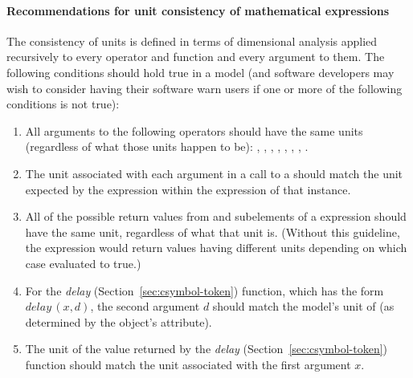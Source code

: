 \paragraph{Recommendations for unit consistency of mathematical expressions}

The consistency of units is defined in terms of dimensional
analysis applied recursively to every operator and function and
every argument to them.  The following conditions should hold true
in a model (and software developers may wish to consider having
their software warn users if one or more of the following
conditions is not true):

\begin{enumerate}

\item All arguments to the following operators should have the same
  units (regardless of what those units happen to be):
  , , ,  ,
  , , , .

\item The unit associated with each argument in a call to a
  \FunctionDefinition should match the unit expected by the
   expression within the  expression of
  that \FunctionDefinition instance.


\item All of the possible return values from  and
   subelements of a  expression
  should have the same unit, regardless of what that unit is.
  (Without this guideline, the  expression would
  return values having different units depending on which case
  evaluated to true.)

\item For the \emph{delay} 
  (Section~\ref{sec:csymbol-token}) function, which has the form
  $\textit{delay}\,(x, d)$, the second argument $d$ should match
  the model's unit of  (as determined by the \Model
  object's  attribute).

\item The unit of the value returned by the \emph{delay}
   (Section~\ref{sec:csymbol-token}) function
  should match the unit associated with the first argument $x$.



\end{enumerate}
